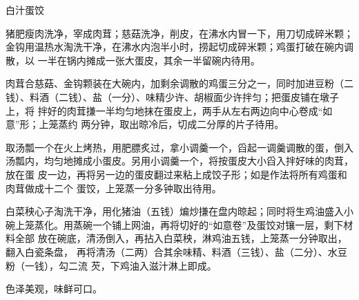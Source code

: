 \begin{recipe}[如意蛋饺]{白汁蛋饺}

\ingredients


\preparation

\step 猪肥瘦肉洗净，宰成肉茸；慈菇洗净，削皮，在沸水内冒一下，用刀切成碎米颗；
金钩用温热水淘洗干净，在沸水内泡半小时，捞起切成碎米颗；鸡蛋打破在碗内调散，以
一半在锅内摊成一张大蛋皮，其余一半留碗内待用。

\step 肉茸合慈菇、金钩颗装在大碗内，加剩余调散的鸡蛋三分之一，同时加进豆粉（二
钱）、料酒（二钱）、盐（一分）、味精少许、胡椒面少许拌匀；把蛋皮铺在墩子上，将
拌好的肉茸搛一半均匀地抹在蛋皮上，两手从左右两边向中心卷成“如意”形；上笼蒸约
两分钟，取出晾冷后，切成二分厚的片子待用。

\step 取汤瓢一个在火上烤热，用肥膘炙过，拿小调羹一个，舀起一调羹调散的蛋，倒入
汤瓢内，均匀地摊成小蛋皮。另用小调羹一个，将按蛋皮大小舀入拌好味的肉茸，放在蛋
皮一边，再将另一边的蛋皮翻过来粘上成饺子形；如是作法将所有鸡蛋和肉茸做成十二个
蛋饺，上笼蒸一分多钟取出待用。

\step 白菜秧心子淘洗干净，用化猪油（五钱）煸炒搛在盘内晾起；同时将生鸡油盛入小
碗上笼蒸化。用蒸碗一个铺上网油，再将切好的“如意卷”及蛋饺对镶一层，剩下材料全部
放在碗底，清汤倒入，再拈入白菜秧，淋鸡油五钱，上笼蒸一分钟取出，翻入白瓷条盘，
再将清汤（二两）合其余味精、料酒（三钱）、盐（二分）、水豆粉（一钱），勾二流
芡，下鸡油入滋汁淋上即成。

\features

色泽美观，味鲜可口。

\end{recipe}

